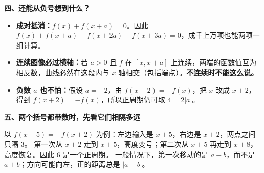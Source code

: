\begin{explanationbox}
\medskip
\end{explanationbox}\clearpage\begin{explanationbox}\textbf{四、还能从负号想到什么？}


\begin{itemize}[leftmargin=*,itemsep=0.4em]
\item \textbf{成对抵消：}$f(x)+f(x+a)=0$。因此 $f(x)+f(x+a)+f(x+2a)+f(x+3a)=0$，成千上万项也能两项一组计算。
\item \textbf{连续图像必过横轴：}若 $a>0$ 且 $f$ 在 $[x,x+a]$ 上连续，两端的函数值互为相反数，曲线必然在这段内与 $x$ 轴相交（包括端点）。\textbf{不连续时不能这么说。}
\item \textbf{负数 $a$ 也不怕：}假设 $a=-2$，由 $f(x-2)=-f(x)$，把 $x$ 改成 $x+2$，得到 $f(x+2)=-f(x)$，所以正周期仍可取 $4=2|a|$。
\end{itemize}
\end{explanationbox}
\clearpage
\begin{explanationbox}
\textbf{五、两个括号都带数时，先看它们相隔多远}


以 $f(x+5)=-f(x+2)$ 为例：左边输入是 $x+5$，右边是 $x+2$，两点之间只隔 $3$。
第一次从 $x+2$ 走到 $x+5$，高度变号；第二次从 $x+5$ 再走到 $x+8$，高度恢复。因此 $6$ 是一个正周期。
一般情况下，第一次移动的是 $a-b$，而不是 $a+b$；方向可能向左，正的距离总是 $|a-b|$。

\end{explanationbox}
